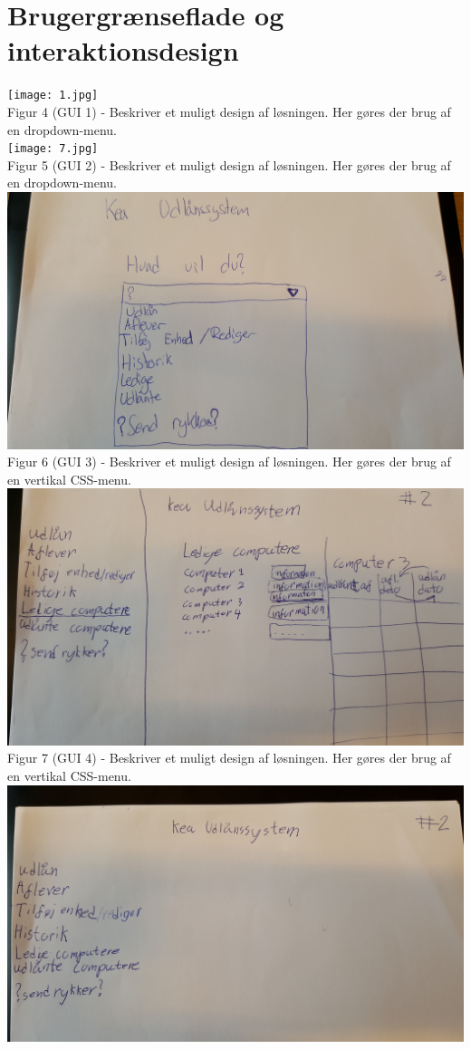 \documentclass[a4paper]{article}
\begin{document}
\section{Brugergrænseflade og interaktionsdesign}
\texttt{[image: 1.jpg]}\\
Figur 4 (GUI 1) -  Beskriver et muligt design af løsningen. Her gøres der brug af en dropdown-menu.\\
\texttt{[image: 7.jpg]}\\
Figur 5 (GUI 2) - Beskriver et muligt design af løsningen. Her gøres der brug af en dropdown-menu.\\
\includegraphics[scale=0.07]{5.jpg}\\
Figur 6 (GUI 3) - Beskriver et muligt design af løsningen. Her gøres der brug af en vertikal CSS-menu.\\
\includegraphics[scale=0.07]{6.jpg}\\
Figur 7 (GUI 4) - Beskriver et muligt design af løsningen. Her gøres der brug af en vertikal CSS-menu.\\
\includegraphics[scale=0.07]{4.jpg}\\
\end{document}
